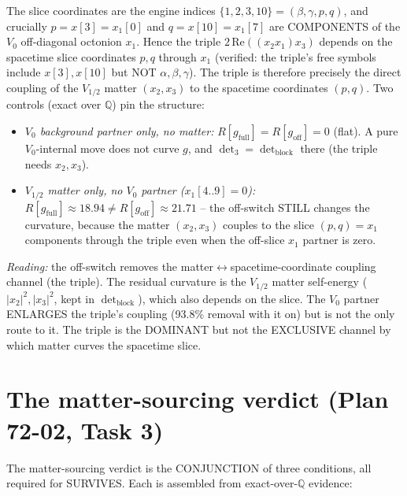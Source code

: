 The slice coordinates are the engine indices $\{1,2,3,10\}=(\beta,\gamma,p,q)$, and
crucially $p=x[3]=x_1[0]$ and $q=x[10]=x_1[7]$ are COMPONENTS of the $V_0$ off-diagonal
octonion $x_1$. Hence the triple $2\,\mathrm{Re}((x_2x_1)x_3)$ depends on the spacetime
slice coordinates $p,q$ through $x_1$ (verified: the triple's free symbols include
$x[3],x[10]$ but NOT $\alpha,\beta,\gamma$). The triple is therefore precisely the
direct coupling of the $V_{1/2}$ matter $(x_2,x_3)$ to the spacetime coordinates
$(p,q)$. Two controls (exact over $\mathbb{Q}$) pin the structure:
\begin{itemize}
  \item \emph{$V_0$ background partner only, no matter:} $R[g_{\mathrm{full}}]=
        R[g_{\mathrm{off}}]=0$ (flat). A pure $V_0$-internal move does not curve $g$, and
        $\det_3=\det_{\mathrm{block}}$ there (the triple needs $x_2,x_3$).
  \item \emph{$V_{1/2}$ matter only, no $V_0$ partner ($x_1[4..9]=0$):}
        $R[g_{\mathrm{full}}]\approx18.94\neq R[g_{\mathrm{off}}]\approx21.71$ -- the
        off-switch STILL changes the curvature, because the matter $(x_2,x_3)$ couples to
        the slice $(p,q)=x_1$ components through the triple even when the off-slice $x_1$
        partner is zero.
\end{itemize}
\emph{Reading:} the off-switch removes the matter$\leftrightarrow$spacetime-coordinate
coupling channel (the triple). The residual curvature is the $V_{1/2}$ matter
self-energy ($|x_2|^2,|x_3|^2$, kept in $\det_{\mathrm{block}}$), which also depends on
the slice. The $V_0$ partner ENLARGES the triple's coupling (93.8\% removal with it on)
but is not the only route to it. The triple is the DOMINANT but not the EXCLUSIVE channel
by which matter curves the spacetime slice.

\section{The matter-sourcing verdict (Plan 72-02, Task 3)}
\label{sec:verdict}

The matter-sourcing verdict is the CONJUNCTION of three conditions, all required for
SURVIVES. Each is assembled from exact-over-$\mathbb{Q}$ evidence:

